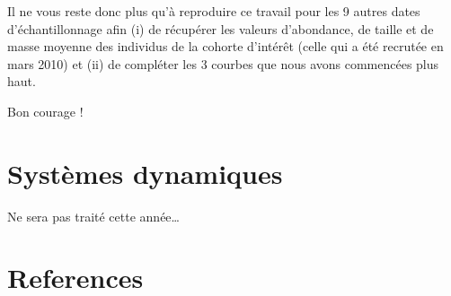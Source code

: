 \documentclass[
  a4paper,
  DIV=11,
  numbers=noendperiod,
  oneside]{scrreprt}
\begin{document}
Il ne vous reste donc plus qu'à reproduire ce travail pour les 9 autres
dates d'échantillonnage afin (i) de récupérer les valeurs d'abondance,
de taille et de masse moyenne des individus de la cohorte d'intérêt
(celle qui a été recrutée en mars 2010) et (ii) de compléter les 3
courbes que nous avons commencées plus haut.

Bon courage !


\hypertarget{sec-dynam}{%
\chapter{Systèmes dynamiques}\label{sec-dynam}}

Ne sera pas traité cette année\ldots{}


\hypertarget{references}{%
\chapter*{References}\label{references}}
\end{document}
